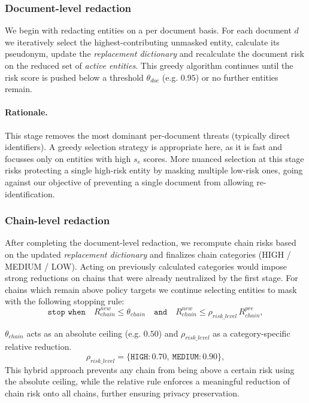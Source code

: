 \subsubsection{Document-level redaction}
We begin with redacting entities on a per document basis. For each document $d$ we iteratively select the highest-contributing unmasked entity, calculate its pseudonym, update the \textit{replacement dictionary} and recalculate the document risk on the reduced set of \textit{active entities}. This greedy algorithm continues until the risk score is pushed below a threshold $\theta_{doc}$ (e.g. $0.95$) or no further entities remain.
\paragraph{Rationale.} This stage removes the most dominant per-document threats (typically direct identifiers). A greedy selection strategy is appropriate here, as it is fast and focusses only on entities with high $s_e$ scores. More nuanced selection at this stage risks protecting a single high-risk entity by masking multiple low-risk ones, going against our objective of preventing a single document from allowing re-identification.

\subsubsection{Chain-level redaction}
After completing the document-level redaction, we recompute chain risks based on the updated \textit{replacement dictionary} and finalizes chain categories (HIGH / MEDIUM / LOW). Acting on previously calculated categories would impose strong reductions on chains that were already neutralized by the first stage. For chains which remain above policy targets we continue selecting entities to mask with the following stopping rule: 
\[
\texttt{stop when}\quad R_{chain}^{new} \le \theta_{chain} \quad \texttt{and} \quad R_{chain}^{new} \le \rho_{risk\_level}\,R_{chain}^{pre},
\]

$\theta_{chain}$ acts as an absolute ceiling (e.g. $0.50$) and $\rho_{risk\_level}$ as a category-specific relative reduction.
\[
\rho_{risk\_level} = \{\texttt{HIGH}:0.70,\ \texttt{MEDIUM}:0.90\},
\]
This hybrid approach prevents any chain from being above a certain risk using the absolute ceiling, while the relative rule enforces a meaningful reduction of chain risk onto all chains, further ensuring privacy preservation.

